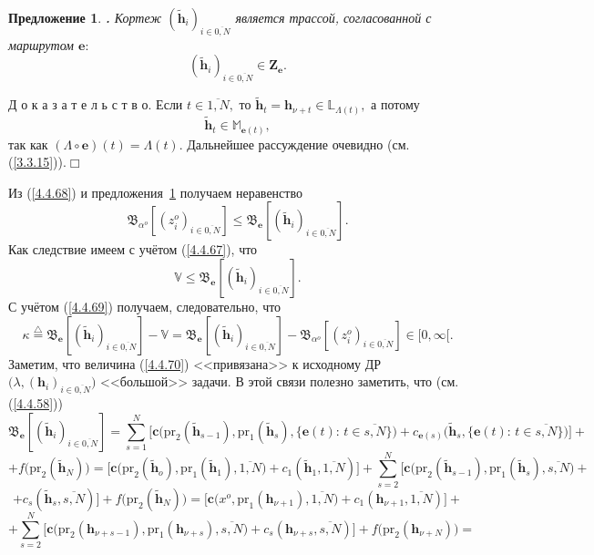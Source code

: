 \documentclass[12pt]{report}
\newcommand{\bfn}{\begin{equation}}
\newcommand{\efn}{\end{equation}}
\newcommand{\df}{\stackrel{\triangle}{=}}
\newcommand{\ov}{\overline}
\newcounter{theo}
\newcounter{pred}
\newtheorem{pred}{Предложение}[section]
\newcommand{\TL}{\mbox{\bf{$\!\!$.}}}
\newcommand{\La}{\Lambda}
\newcommand{\la}{\lambda}
\newcommand{\al}{\alpha}
\newcommand{\bbl}{{\mathbb L}}
\newcommand{\bbm}{{\mathbb M}}
\begin{document}
{\begin{pred}\label{p4.4.5}{\TL} Кортеж $(\tilde{\mathbf{h}}_i)_{i\in\ov{0,N}}$
является трассой, согласованной с маршрутом $\mathbf{e}:$
$$
(\tilde{\mathbf{h}}_i)_{i\in\ov{0,N}}\in \mathbf{Z}_\mathbf{e}.
$$
\end{pred}

Д о к а з а т е л ь с т в о. Если $t\in \ov{1,N},$ то $\tilde{\mathbf{h}}_t =
\mathbf{h}_{\nu +t}\in \bbl_{\La(t)},$ а потому
$$
\tilde{\mathbf{h}}_t \in \bbm_{\mathbf{e}(t)},
$$
так как $(\La \circ \mathbf{e})(t) = \La(t).$ Дальнейшее рассуждение очевидно
(см. (\ref{3.3.15})).\hfill $\Box$ \smallskip

Из (\ref{4.4.68}) и предложения~{\ref{p4.4.5} получаем неравенство
$$
\mathfrak{B}_{\al^o}[(z_i^o)_{i\in\ov{0,N}}]\leqslant
\mathfrak{B}_\mathbf{e}[(\tilde{\mathbf{h}}_i)_{i\in\ov{0,N}}].
$$
Как следствие имеем с учётом (\ref{4.4.67}), что
\bfn\label{4.4.69}
\mathbb{V} \leqslant \mathfrak{B}_\mathbf{e}[(\tilde{\mathbf{h}}_i)_{i\in\ov{0,N}}].
\efn
С учётом (\ref{4.4.69}) получаем, следовательно, что
\bfn\label{4.4.70}
\kappa \df \mathfrak{B}_\mathbf{e}[(\tilde{\mathbf{h}}_i)_{i\in\ov{0,N}}] -
\mathbb{V} = \mathfrak{B}_\mathbf{e}[(\tilde{\mathbf{h}}_i)_{i\in\ov{0,N}}]-
\mathfrak{B}_{\al^o}[(z_i^o)_{i\in\ov{0,N}}]\in [0,\infty[.
\efn
Заметим, что величина (\ref{4.4.70}) <<привязана>> к исходному ДР $\bigl(\la,(\mathbf{h}_i)_{i\in\ov{0,N}}\bigl)$ <<большой>> задачи. В этой связи полезно заметить, что (см. (\ref{4.4.58}))
$$
\mathfrak{B}_\mathbf{e}[(\tilde{\mathbf{h}}_i)_{i\in\ov{0,N}}]=
\sum\limits_{s=1}^N\bigl[\mathbf{c}\bigl(\mathrm{pr}_2(\tilde{\mathbf{h}}_{s-1}),\mathrm{pr}_1
(\tilde{\mathbf{h}}_s),\{\mathbf{e}(t):\,t\in\ov{s,N}\}\bigl) +
c_{\mathbf{e}(s)}\bigl(\tilde{\mathbf{h}}_s,\{\mathbf{e}(t):\,t\in\ov{s,N}\}\bigl)\bigl] +
$$
$$
+ f\bigl(\mathrm{pr}_2(\tilde{\mathbf{h}}_N)\bigl) = \bigl[\mathbf{c}\bigl(\mathrm{pr}_2
(\tilde{\mathbf{h}}_o),\mathrm{pr}_1(\tilde{\mathbf{h}}_1),\ov{1,N}) +
c_1(\tilde{\mathbf{h}}_1,\ov{1,N})\bigl] +
\sum\limits_{s=2}^N\bigl[\mathbf{c}\bigl(\mathrm{pr}_2(\tilde{\mathbf{h}}_{s-1}),
\mathrm{pr}_1(\tilde{\mathbf{h}}_s),\ov{s,N}\bigl) +
$$
$$
+ c_s(\tilde{\mathbf{h}}_s,\ov{s,N})\bigl] +
f\bigl(\mathrm{pr}_2(\tilde{\mathbf{h}}_N)\bigl) =
\bigl[\mathbf{c}\bigl(x^o,\mathrm{pr}_1(\mathbf{h}_{\nu+1}),\ov{1,N}\bigl) +
c_1(\mathbf{h}_{\nu+1},\ov{1,N})\bigl] + $$
$$+ \sum\limits_{s=2}^N\bigl[\mathbf{c}\bigl(\mathrm{pr}_2(\mathbf{h}_{\nu+s-1}),
\mathrm{pr}_1(\mathbf{h}_{\nu+s}),\ov{s,N}\bigl) + c_s(\mathbf{h}_{\nu+s},\ov{s,N})\bigl] +
f\bigl(\mathrm{pr}_2(\mathbf{h}_{\nu+N})\bigl) =
$$}}
\end{document}
